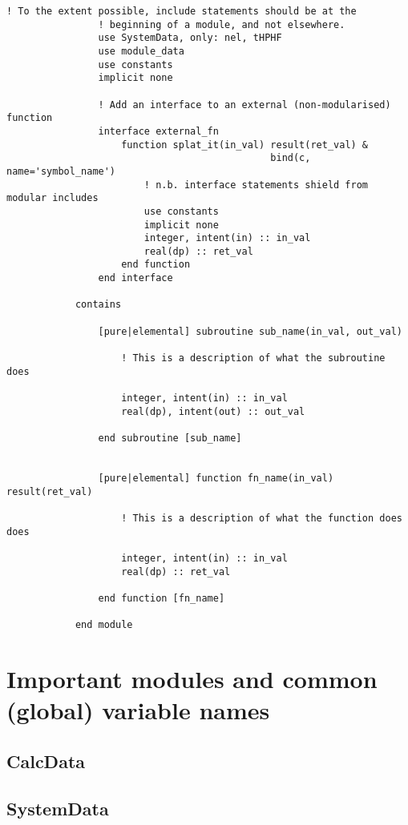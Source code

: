 \documentclass[a4paper,notitlepage]{scrreprt}
\begin{document}
\begin{description}
\begin{lstlisting}[gobble=12]
            	! To the extent possible, include statements should be at the
				! beginning of a module, and not elsewhere.
            	use SystemData, only: nel, tHPHF
            	use module_data
            	use constants
            	implicit none
            
            	! Add an interface to an external (non-modularised) function
            	interface external_fn
            		function splat_it(in_val) result(ret_val) &
											  bind(c, name='symbol_name')
            			! n.b. interface statements shield from modular includes
            			use constants
            			implicit none
            			integer, intent(in) :: in_val
            			real(dp) :: ret_val
            		end function
            	end interface
            
            contains
            
            	[pure|elemental] subroutine sub_name(in_val, out_val)
            
            		! This is a description of what the subroutine does
            
            		integer, intent(in) :: in_val
            		real(dp), intent(out) :: out_val
            
            	end subroutine [sub_name]
            
            
            	[pure|elemental] function fn_name(in_val) result(ret_val)
            
            		! This is a description of what the function does does
            
            		integer, intent(in) :: in_val
            		real(dp) :: ret_val
            
            	end function [fn_name]
            
            end module
		\end{lstlisting}

\end{description}

\section{Important modules and common (global) variable names}
\label{sect:cons-types}

\subsection{\ttfamily CalcData}
\subsection{\ttfamily SystemData}
\end{document}
